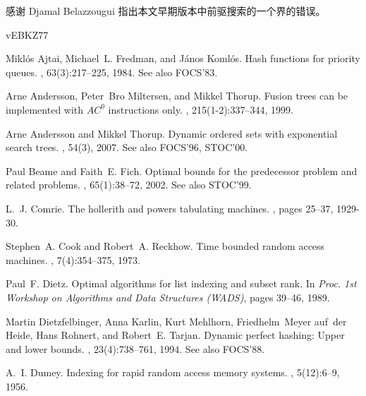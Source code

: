 \documentclass[11pt,a4paper]{ctexart}
\begin{document}
感谢 Djamal Belazzougui 指出本文早期版本中前驱搜索的一个界的错误。

\newcommand{\etalchar}[1]{$^{#1}$}
\begin{thebibliography}{vEBKZ77}

Mikl\'{o}s Ajtai, Michael~L. Fredman, and J{\'a}nos Koml{\'o}s.
\newblock Hash functions for priority queues.
, 63(3):217--225, 1984.
\newblock See also FOCS'83.

Arne Andersson, Peter~Bro Miltersen, and Mikkel Thorup.
\newblock Fusion trees can be implemented with {$AC^0$} instructions only.
, 215(1-2):337--344, 1999.

Arne Andersson and Mikkel Thorup.
\newblock Dynamic ordered sets with exponential search trees.
, 54(3), 2007.
\newblock See also FOCS'96, STOC'00.

Paul Beame and Faith~E. Fich.
\newblock Optimal bounds for the predecessor problem and related problems.
, 65(1):38--72, 2002.
\newblock See also STOC'99.

L.~J. Comrie.
\newblock The hollerith and powers tabulating machines.
, pages 25--37, 1929-30.

Stephen~A. Cook and Robert~A. Reckhow.
\newblock Time bounded random access machines.
, 7(4):354--375, 1973.

Paul~F. Dietz.
\newblock Optimal algorithms for list indexing and subset rank.
\newblock In {\em Proc. 1st Workshop on Algorithms and Data Structures (WADS)}, pages 39--46, 1989.

\bibitem[DKM{\etalchar{+}}94]{dietzfel94dph}
Martin Dietzfelbinger, Anna Karlin, Kurt Mehlhorn, Friedhelm~Meyer auf~der Heide, Hans Rohnert, and Robert~E. Tarjan.
\newblock Dynamic perfect hashing: Upper and lower bounds.
, 23(4):738--761, 1994.
\newblock See also FOCS'88.

A.~I. Dumey.
\newblock Indexing for rapid random access memory systems.
, 5(12):6--9, 1956.


\end{thebibliography}
\end{document}
